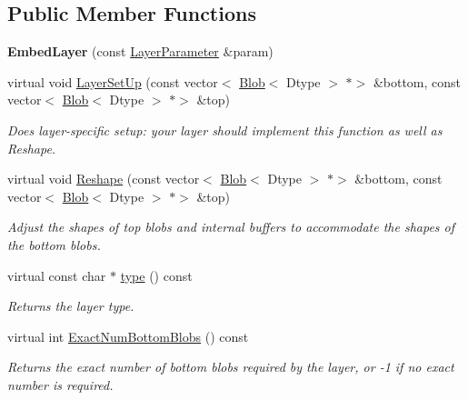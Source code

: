 \subsection*{Public Member Functions}
\begin{DoxyCompactItemize}
\item 
\mbox{\label{classcaffe_1_1_embed_layer_afbf978848b6e28d3fd549d780f5b82ae}} 
{\bfseries Embed\+Layer} (const \mbox{\hyperlink{classcaffe_1_1_layer_parameter}{Layer\+Parameter}} \&param)
\item 
virtual void \mbox{\hyperlink{classcaffe_1_1_embed_layer_aaace16d2beba7db887c7b59213268bc2}{Layer\+Set\+Up}} (const vector$<$ \mbox{\hyperlink{classcaffe_1_1_blob}{Blob}}$<$ Dtype $>$ $\ast$$>$ \&bottom, const vector$<$ \mbox{\hyperlink{classcaffe_1_1_blob}{Blob}}$<$ Dtype $>$ $\ast$$>$ \&top)
\begin{DoxyCompactList}\small\item\em Does layer-\/specific setup\+: your layer should implement this function as well as Reshape. \end{DoxyCompactList}\item 
virtual void \mbox{\hyperlink{classcaffe_1_1_embed_layer_ac7c19a708d491f9fe161c78348ec794b}{Reshape}} (const vector$<$ \mbox{\hyperlink{classcaffe_1_1_blob}{Blob}}$<$ Dtype $>$ $\ast$$>$ \&bottom, const vector$<$ \mbox{\hyperlink{classcaffe_1_1_blob}{Blob}}$<$ Dtype $>$ $\ast$$>$ \&top)
\begin{DoxyCompactList}\small\item\em Adjust the shapes of top blobs and internal buffers to accommodate the shapes of the bottom blobs. \end{DoxyCompactList}\item 
\mbox{\label{classcaffe_1_1_embed_layer_adf4e7eb6e6fa3722ba00b877f43a96db}} 
virtual const char $\ast$ \mbox{\hyperlink{classcaffe_1_1_embed_layer_adf4e7eb6e6fa3722ba00b877f43a96db}{type}} () const
\begin{DoxyCompactList}\small\item\em Returns the layer type. \end{DoxyCompactList}\item 
virtual int \mbox{\hyperlink{classcaffe_1_1_embed_layer_a0634500a12e1d2299b7c8556976e4529}{Exact\+Num\+Bottom\+Blobs}} () const
\begin{DoxyCompactList}\small\item\em Returns the exact number of bottom blobs required by the layer, or -\/1 if no exact number is required. \end{DoxyCompactList}\item 

\end{DoxyCompactItemize}
